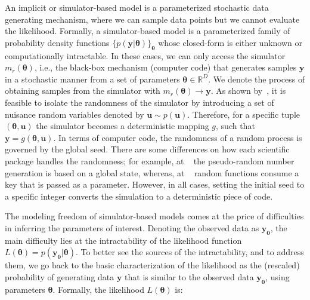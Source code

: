 \documentclass[article, shortnames]{jss}
\newcommand{\ub}{\mathbf{u}}
\newcommand{\yb}{\mathbf{y}}
\newcommand{\thetab}{\boldsymbol{\theta}}
\newcommand{\simulator}{g}
\newcommand{\data}{\mathbf{y_0}}
\begin{document}
An implicit or simulator-based model is a parameterized stochastic
data generating mechanism, where we can sample data points but we
cannot evaluate the likelihood. Formally, a simulator-based model is a
parameterized family of probability density functions
\(\{ p(\yb|\thetab)\}_{\thetab}\) whose closed-form is either unknown
or computationally intractable. In these cases, we can only access the
simulator \( m_r(\thetab) \), i.e., the black-box mechanism (computer
code) that generates samples \(\yb\) in a stochastic manner from a set
of parameters \(\thetab \in \mathbb{R}^D\). We denote the process of
obtaining samples from the simulator with
\( m_r(\thetab) \rightarrow \yb \). As shown by~\citet{Meeds2015}, it
is feasible to isolate the randomness of the simulator by introducing
a set of nuisance random variables denoted by \(\ub \sim
p(\ub)\). Therefore, for a specific tuple \((\thetab, \ub)\) the
simulator becomes a deterministic mapping \(g\), such that
\(\yb=\simulator(\thetab,\ub)\). In terms of computer code, the
randomness of a random process is governed by the global seed. There
are some differences on how each scientific package handles the
randomness; for example, at ~\citet{harris2020array} the
pseudo-random number generation is based on a global state, whereas,
at ~\citet{jax2018github} random functions consume a key that
is passed as a parameter. However, in all cases, setting the initial
seed to a specific integer converts the simulation to a deterministic
piece of code.

The modeling freedom of simulator-based models comes at the price of
difficulties in inferring the parameters of interest. Denoting the
observed data as \(\data\), the main difficulty lies at the
intractability of the likelihood function
\(L(\thetab) = p(\data|\thetab)\). To better see the sources of the
intractability, and to address them, we go back to the basic
characterization of the likelihood as the (rescaled) probability of
generating data \(\yb\) that is similar to the observed data
\(\data\), using parameters \(\thetab\). Formally, the likelihood
\(L(\thetab)\) is:
\end{document}
